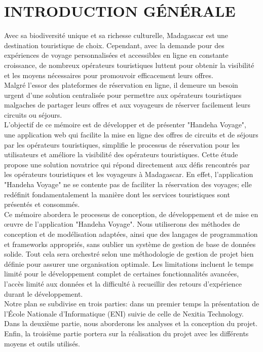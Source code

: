 \documentclass[12pt]{report}
\begin{document}
			\chapter*{INTRODUCTION GÉNÉRALE}
			\begin{minipage}{\textwidth}
				\hspace{15pt} Avec sa biodiversité unique et sa richesse culturelle, Madagascar est une destination touristique de choix. Cependant, avec la demande pour des expériences de voyage personnalisées et accessibles en ligne en constante croissance, de nombreux opérateurs touristiques luttent pour obtenir la visibilité et les moyens nécessaires pour promouvoir efficacement leurs offres.\\

				\hspace{15pt} Malgré l'essor des plateformes de réservation en ligne, il demeure un besoin urgent d'une solution centralisée pour permettre aux opérateurs touristiques malgaches de partager leurs offres et aux voyageurs de réserver facilement leurs circuits ou séjours.\\

				\hspace{15pt} L'objectif de ce mémoire est de développer et de présenter "Handeha Voyage", une application web qui  facilite la mise en ligne des offres de circuits et de séjours par les opérateurs touristiques, simplifie le processus de réservation pour les utilisateurs et améliore la visibilité des opérateurs touristiques. Cette étude propose une solution novatrice qui répond directement aux défis rencontrés par les opérateurs touristiques et les voyageurs à Madagascar. En effet, l'application "Handeha Voyage" ne se contente pas de faciliter la réservation des voyages; elle redéfinit fondamentalement la manière dont les services touristiques sont présentés et consommés.\\

				\hspace{15pt} Ce mémoire abordera le processus de conception, de développement et de mise en œuvre de l'application "Handeha Voyage". Nous utiliserons des méthodes de conception et de modélisation adaptées, ainsi que des langages de programmation et frameworks appropriés, sans oublier un système de gestion de base de données solide. Tout cela sera orchestré selon une méthodologie de gestion de projet bien définie pour assurer une organisation optimale. Les limitations incluent le temps limité pour le développement complet de certaines fonctionnalités avancées, l'accès limité aux données et la difficulté à recueillir des retours d'expérience durant le développement.\\

				\hspace{15pt} Notre plan se subdivise en trois parties: dans un premier temps la présentation de l’École Nationale d'Informatique (ENI) suivie de celle de Nexitia Technology. Dans la deuxième partie, nous aborderons les analyses et la conception du projet. Enfin, la troisième partie portera sur la réalisation du projet avec les différents moyens et outils utilisés.
			\end{minipage}
\end{document}
